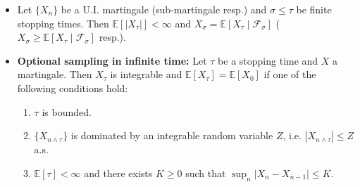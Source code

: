 \documentclass[twoside]{article}
\newcommand\bbE{\mathbb{E}}
\newcommand\calF{\mathcal{F}}
\newcommand\sg{\sigma}
\begin{document}
\begin{itemize}
\item Let $\{X_n\}$ be a U.I. martingale (sub-martingale resp.) and $\sg \leq \tau$ be finite stopping times. Then $\bbE [|X_\tau|] < \infty$ and $X_\sg = \bbE [X_\tau \mid \calF_\sg]$ ($X_\sg \geq \bbE [X_\tau \mid \calF_\sg]$ resp.).

\item \textbf{Optional sampling in infinite time:} Let $\tau$ be a stopping time and $X$ a martingale. Then $X_\tau$ is integrable and $\bbE [X_\tau] = \bbE [X_0]$ if one of the following conditions hold:
\begin{enumerate}
\item $\tau$ is bounded.
\item $\{X_{n \wedge \tau}\}$ is dominated by an integrable random variable $Z$, i.e. $|X_{n \wedge \tau}| \leq Z$ a.s.
\item $\bbE [\tau] < \infty$ and there exists $K \geq 0$ such that $\sup_n |X_n - X_{n-1}| \leq K$.
\end{enumerate}

\end{itemize}
\end{document}
